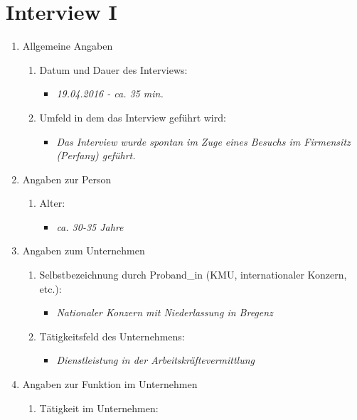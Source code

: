 \documentclass[Bachelorarbeit.tex]{subfiles}
\begin{document}
\section{Interview I}
\label{anhang:interview1}
\begin{enumerate}
	\item Allgemeine Angaben
	\begin{enumerate}
		\item Datum und Dauer des Interviews:
		\begin{itemize}
			\item[] \textit{19.04.2016 - ca. 35 min.}
		\end{itemize}
		\item Umfeld in dem das Interview geführt wird:
		\begin{itemize}
			\item[] \textit{Das Interview wurde spontan im Zuge eines Besuchs im Firmensitz (Perfany) geführt.}
		\end{itemize}
	\end{enumerate}
	\item Angaben zur Person
	\begin{enumerate}
		\item Alter:
		\begin{itemize}
			\item[] \textit{ca. 30-35 Jahre}
		\end{itemize}
	\end{enumerate}
	\item Angaben zum Unternehmen
	\begin{enumerate}
		\item Selbstbezeichnung durch Proband\_in  (\ac{KMU}, internationaler Konzern, etc.):
		\begin{itemize}
			\item[] \textit{Nationaler Konzern mit Niederlassung in Bregenz}
		\end{itemize}
		\item Tätigkeitsfeld des Unternehmens:
		\begin{itemize}
			\item[] \textit{Dienstleistung in der Arbeitskräftevermittlung}
		\end{itemize}
	\end{enumerate}
	\item Angaben zur Funktion im Unternehmen
	\begin{enumerate}
		\item Tätigkeit im Unternehmen:
		\begin{itemize}

\end{itemize}
\end{enumerate}
\end{enumerate}
\end{document}
